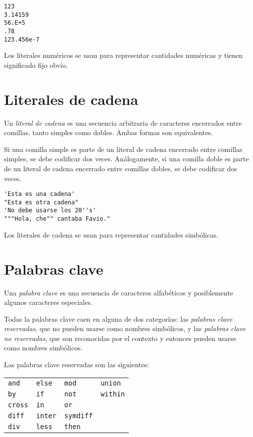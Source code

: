 \documentclass[11pt,spanish]{report}
\def\para#1{\noindent{\bf#1}}
\begin{document}
\begin{verbatim}
123
3.14159
56.E+5
.78
123.456e-7
\end{verbatim}

Los literales numéricos se usan para representar cantidades numéricas y tienen significado fijo obvio.

\section{Literales de cadena}

Un {\it literal de cadena} es una secuencia arbitraria de caracteres encerrados entre comillas, tanto simples como dobles. Ambas formas son equivalentes.

Si una comilla simple es parte de un literal de cadena encerrado entre comillas simples, se debe codificar dos veces. Análogamente, si una comilla doble es parte de un literal de cadena encerrado entre comillas dobles, se debe codificar dos veces.

\para{Ejemplos}

\begin{verbatim}
'Esta es una cadena'
"Esta es otra cadena"
'No debe usarse los 20''s'
"""Hola, che"" cantaba Favio."
\end{verbatim}

Los literales de cadena se usan para representar cantidades simbólicas.

\section{Palabras clave}

Una {\it palabra clave} es una secuencia de caracteres alfabéticos y posiblemente algunos caracteres especiales.

Todas la palabras clave caen en alguna de dos categorías: las {\it palabras clave reservadas}, que no pueden usarse como nombres simbólicos, y las {\it palabras clave no reservadas}, que son reconocidas por el contexto y entonces pueden usarse como nombres simbólicos.

Las palabras clave reservadas son las siguientes:

\noindent\hfil
\begin{tabular}{@{}p{.7in}p{.7in}p{.7in}p{.7in}@{}}
{\tt and}&{\tt else}&{\tt mod}&{\tt union}\\
{\tt by}&{\tt if}&{\tt not}&{\tt within}\\
{\tt cross}&{\tt in}&{\tt or}\\
{\tt diff}&{\tt inter}&{\tt symdiff}\\
{\tt div}&{\tt less}&{\tt then}\\
\end{tabular}
\end{document}
